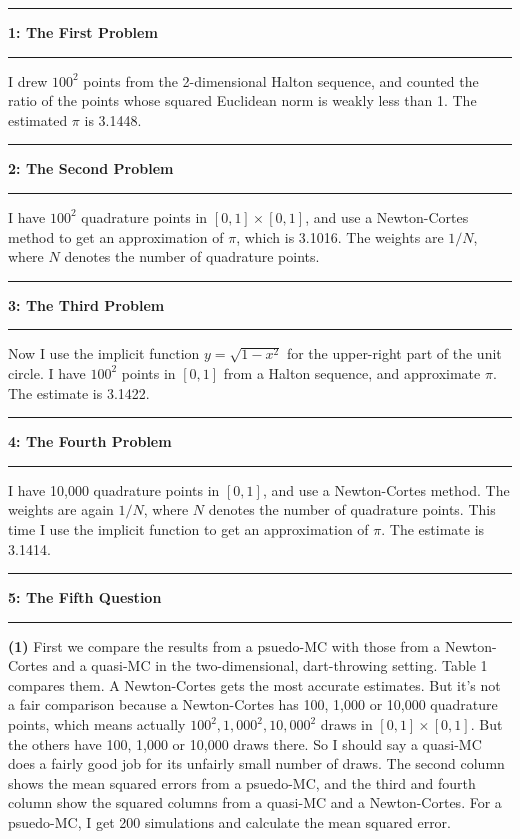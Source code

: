\documentclass[10pt]{article}
\newcommand\question[2]{\vspace{.25in}\hrule\textbf{#1: #2}\vspace{.5em}\hrule\vspace{.10in}}
\renewcommand\part[1]{\vspace{.10in}\textbf{(#1)}}
\begin{document}
\raggedright
\newcommand\NAME{Motoaki Takahashi}  %
\newcommand\ANDREWID{mxt323}     %
\newcommand\HWNUM{4}              %


\question{1}{The First Problem} 
I drew $100^2$ points from the 2-dimensional Halton sequence, and counted the ratio of the points whose squared Euclidean norm is weakly less than 1. The estimated $\pi$ is 3.1448.



\question{2}{The Second Problem}
I have $100^2$ quadrature points in $[0, 1]\times[0, 1]$, and use a Newton-Cortes method to get an approximation of $\pi$, which is 3.1016. The weights are $1/N$, where $N$ denotes the number of quadrature points.

\question{3}{The Third Problem}
Now I use the implicit function $y=\sqrt{1-x^2}$ for the upper-right part of the unit circle. I have $100^2$ points in $[0, 1]$ from a Halton sequence, and approximate $\pi$. The estimate is 3.1422.

\question{4}{The Fourth Problem}
I have 10,000 quadrature points in $[0, 1]$, and use a Newton-Cortes method. The weights are again $1/N$, where $N$ denotes the number of quadrature points. This time I use the implicit function to get an approximation of $\pi$. The estimate is 3.1414.

\question{5}{The Fifth Question}
\part{1} First we compare the results from a psuedo-MC with those from a Newton-Cortes and a quasi-MC in the two-dimensional, dart-throwing setting. Table 1 compares them. A Newton-Cortes gets the most accurate estimates. But it's not a fair comparison because a Newton-Cortes has 100, 1,000 or 10,000 quadrature points, which means actually $100^2, 1,000^2, 10,000^2$ draws in $[0, 1]\times[0, 1]$. But the others have 100, 1,000 or 10,000 draws there. So I should say a quasi-MC does a fairly good job for its unfairly small number of draws. The second column shows the mean squared errors from a psuedo-MC, and the third and fourth column show the squared columns from a quasi-MC and a Newton-Cortes. For a psuedo-MC, I get 200 simulations and calculate the mean squared error.
\end{document}
